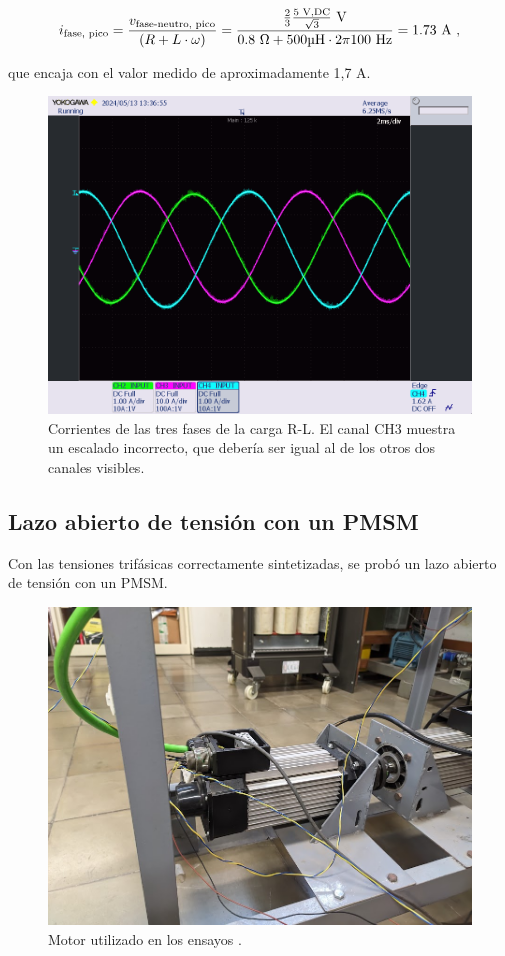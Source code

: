 \[
i_{\text{fase, pico}} = \frac{v_{\text{fase-neutro, pico}}}{(R + L\cdot\omega)} = \frac{\frac{2}{3}\frac{5 \text{ V,DC}}{\sqrt{3}} \text{ V}}{0.8 \text{ }\Omega + 500 \text{\unit{\micro\henry}} \cdot 2\pi100 \text{ Hz}} = 1.73 \text{ A ,}
\]

que encaja con el valor medido de aproximadamente 1,7 A.


\begin{figure}[H]
	\centering
	\includegraphics[width=0.7\linewidth]{fig/3RLcurrent}
	\caption{Corrientes de las tres fases de la carga R-L. El canal CH3 muestra un escalado incorrecto, que debería ser igual al de los otros dos canales visibles.}
\end{figure}

\subsection{Lazo abierto de tensión con un PMSM}

Con las tensiones trifásicas correctamente sintetizadas, se probó un lazo abierto de tensión con un PMSM.

\begin{figure}[H]
	\centering
	\includegraphics[width=0.7\linewidth]{fig/motorLab}
	\caption{Motor utilizado en los ensayos \cite{mavilor2018}.}
\end{figure}


